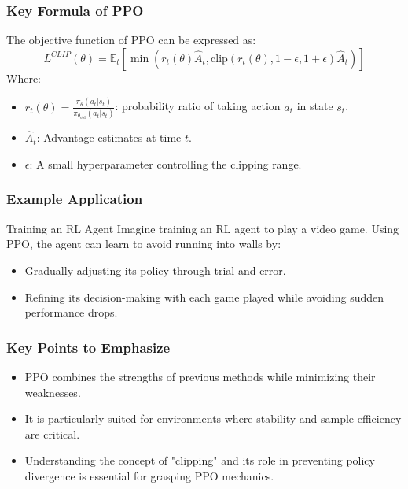 \documentclass{beamer}
\begin{document}
\begin{frame}[fragile]
    \frametitle{Key Formula of PPO}
    The objective function of PPO can be expressed as:
    \begin{equation}
        L^{CLIP}(\theta) = \mathbb{E}_t \left[ \min \left( r_t(\theta) \hat{A}_t, \text{clip}(r_t(\theta), 1 - \epsilon, 1 + \epsilon) \hat{A}_t \right) \right]
    \end{equation}
    Where:
    \begin{itemize}
        \item \( r_t(\theta) = \frac{\pi_{\theta}(a_t | s_t)}{\pi_{\theta_{\text{old}}}(a_t | s_t)} \): probability ratio of taking action \( a_t \) in state \( s_t \).
        \item \( \hat{A}_t \): Advantage estimates at time \( t \).
        \item \( \epsilon \): A small hyperparameter controlling the clipping range.
    \end{itemize}
\end{frame}

\begin{frame}[fragile]
    \frametitle{Example Application}
    \begin{block}{Training an RL Agent}
        Imagine training an RL agent to play a video game. Using PPO, the agent can learn to avoid running into walls by:
        \begin{itemize}
            \item Gradually adjusting its policy through trial and error.
            \item Refining its decision-making with each game played while avoiding sudden performance drops.
        \end{itemize}
    \end{block}
\end{frame}

\begin{frame}[fragile]
    \frametitle{Key Points to Emphasize}
    \begin{itemize}
        \item PPO combines the strengths of previous methods while minimizing their weaknesses.
        \item It is particularly suited for environments where stability and sample efficiency are critical.
        \item Understanding the concept of "clipping" and its role in preventing policy divergence is essential for grasping PPO mechanics.
    \end{itemize}
\end{frame}
\end{document}
